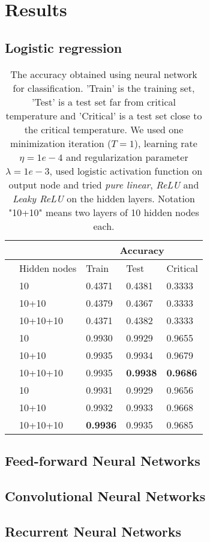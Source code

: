 \section{Results} \label{sec:results}

\subsection{Logistic regression}
\iffalse
\begin{figure} [H]
	\centering
	\texttt{[image: ../plots/lambda\_vs\_R2\_linear.png]}
	\caption{The R$^2$-score as a function of the penalty. }
	\label{fig:lambda_vs_R2_linear}
\end{figure} 
\fi

\begin{table} [H]
	\caption{The accuracy obtained using neural network for classification. 'Train' is the training set, 'Test' is a test set far from critical temperature and 'Critical' is a test set close to the critical temperature. We used one minimization iteration ($T=1$), learning rate $\eta=1e-4$ and regularization parameter $\lambda=1e-3$, used logistic activation function on output node and tried \textit{pure linear}, \textit{ReLU} and \textit{Leaky ReLU} on the hidden layers. Notation "10+10" means two layers of 10 hidden nodes each.}
	\begin{tabularx}{\textwidth}{l|l|XXX} \hline\hline
		\label{tab:nn_class}
		&& \multicolumn{3}{c}{\textbf{Accuracy}}\\ \hline
		&Hidden nodes&Train&Test&Critical\\ \hline
		
		\parbox[t]{2mm}{}
		&10 & 0.4371 & 0.4381 & 0.3333 \\
		&10+10 & 0.4379 & 0.4367 & 0.3333 \\
		&10+10+10 & 0.4371 & 0.4382 & 0.3333 \\ \hline
		
		\parbox[t]{2mm}{}
		&10 & 0.9930 & 0.9929 & 0.9655 \\
		&10+10 & 0.9935 & 0.9934 & 0.9679 \\
		&10+10+10 & 0.9935 & \textbf{0.9938} & \textbf{0.9686} \\ \hline
		
		\parbox[t]{2mm}{}
		&10 & 0.9931 & 0.9929 & 0.9656 \\
		&10+10 & 0.9932 & 0.9933 & 0.9668 \\
		&10+10+10 & \textbf{0.9936} & 0.9935 & 0.9685 \\ \hline\hline
	\end{tabularx}
\end{table}

\subsection{Feed-forward Neural Networks}

\subsection{Convolutional Neural Networks}

\subsection{Recurrent Neural Networks}

